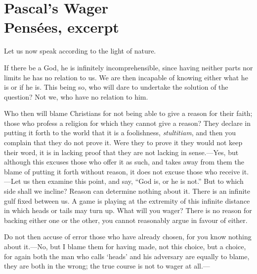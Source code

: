 
\author{Blaise Pascal}
\chapter[Blaise Pascal -- Pascal's Wager]{Pascal's Wager\\\smaller
Pens\'{e}es, excerpt}


Let us now speak according to the light of nature.

If there be a God, he is infinitely incomprehensible, since having
neither parts nor limits he has no relation to us. We are then
incapable of knowing either what he is or if he is. This being so, who
will dare to undertake the solution of the question? Not we, who have
no relation to him.

Who then will blame Christians for not being able to give a reason for
their faith; those who profess a religion for which they cannot give a
reason? They declare in putting it forth to the world that it is a
foolishness, \textit{stultitiam}, and then you complain that they do
not prove it. Were they to prove it they would not keep their word, it
is in lacking proof that they are not lacking in sense.---Yes, but
although this excuses those who offer it as such, and takes away from
them the blame of putting it forth without reason, it does not excuse
those who receive it.---Let us then examine this point, and say, ``God
is, or he is not.'' But to which side shall we incline? Reason can
 determine nothing about it. There is an infinite gulf fixed
between us. A game is playing at the extremity of this infinite
distance in which heads or tails may turn up. What will you wager?
There is no reason for backing either one or the other, you cannot
reasonably argue in favour of either.

Do not then accuse of error those who have already chosen, for you
know nothing about it.---No, but I blame them for having made, not
this choice, but a choice, for again both the man who calls `heads'
and his adversary are equally to blame, they are both in the wrong;
the true course is not to wager at all.---

